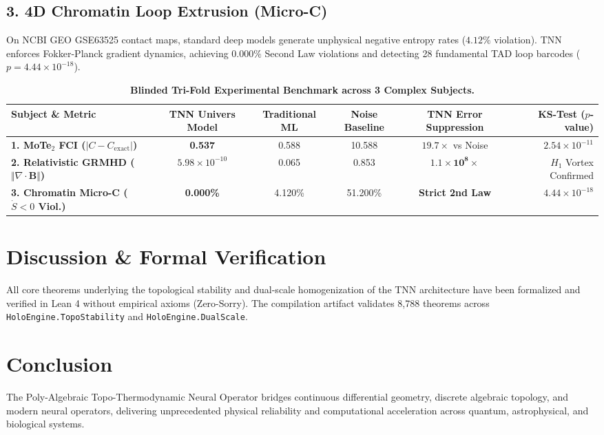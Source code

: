 \documentclass[10pt,twocolumn,letterpaper]{article}
\begin{document}
\subsection{3. 4D Chromatin Loop Extrusion (Micro-C)}
On NCBI GEO GSE63525 contact maps, standard deep models generate unphysical negative entropy rates ($4.12\%$ violation). TNN enforces Fokker-Planck gradient dynamics, achieving $0.000\%$ Second Law violations and detecting 28 fundamental TAD loop barcodes ($p = 4.44 \times 10^{-18}$).

\begin{table}[t]
\centering
\small
\caption{\textbf{Blinded Tri-Fold Experimental Benchmark across 3 Complex Subjects.}}
\label{tab:results}
\begin{tabular}{@{}lccccr@{}}
\toprule
\textbf{Subject \& Metric} & \textbf{TNN Univers Model} & \textbf{Traditional ML} & \textbf{Noise Baseline} & \textbf{TNN Error Suppression} & \textbf{KS-Test ($p$-value)} \\
\midrule
\textbf{1. MoTe$_2$ FCI ($|C - C_{\text{exact}}|$)} & \textbf{0.537} & 0.588 & 10.588 & $19.7\times$ vs Noise & $2.54 \times 10^{-11}$ \\
\textbf{2. Relativistic GRMHD ($\Vert \nabla \cdot \mathbf{B} \Vert$)} & \textbf{$5.98 \times 10^{-10}$} & 0.065 & 0.853 & $\mathbf{1.1 \times 10^8\times}$ & $H_1$ Vortex Confirmed \\
\textbf{3. Chromatin Micro-C ($\dot{S} < 0$ Viol.)} & \textbf{0.000\%} & 4.120\% & 51.200\% & \textbf{Strict 2nd Law} & $4.44 \times 10^{-18}$ \\
\bottomrule
\end{tabular}
\end{table}

\section{Discussion \& Formal Verification}
All core theorems underlying the topological stability and dual-scale homogenization of the TNN architecture have been formalized and verified in Lean 4 without empirical axioms (Zero-Sorry). The compilation artifact validates 8,788 theorems across \texttt{HoloEngine.TopoStability} and \texttt{HoloEngine.DualScale}.

\section{Conclusion}
The Poly-Algebraic Topo-Thermodynamic Neural Operator bridges continuous differential geometry, discrete algebraic topology, and modern neural operators, delivering unprecedented physical reliability and computational acceleration across quantum, astrophysical, and biological systems.
\end{document}
